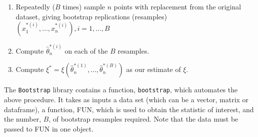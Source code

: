 \documentclass{article}\usepackage[]{graphicx}\usepackage[]{color}
\begin{document}
\begin{enumerate}
\item Repeatedly ($B$ times) sample $n$ points with replacement from the original
dataset, giving bootstrap replications (resamples) $(x_1^{*(i)},\ldots,x_n^{*(i)}), i=1,\ldots,B$
\item Compute $\hat\theta_n^{*(i)}$ on each of the $B$ resamples.
\item Compute $\xi^*=\xi(\hat\theta_n^{*(1)},\ldots,\hat\theta_n^{*(B)})$ as our estimate of $\xi$.
\end{enumerate}

The \texttt{Bootstrap} library contains a function, \texttt{bootstrap}, which automates the above procedure. It takes as inputs a data set (which can be a vector, matrix or dataframe), a function, FUN, which is used to obtain the statistic of interest, and the number, $B$, of bootstrap resamples required. Note that the data must be passed to FUN in one object.
\end{document}

